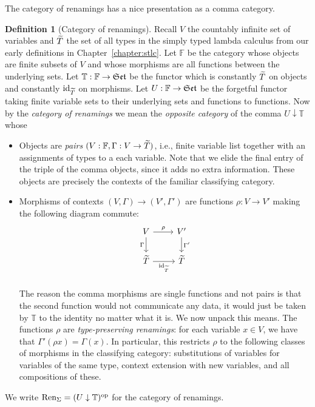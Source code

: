 \documentclass[12pt,twoside]{reedthesis}
\theoremstyle{definition}
\newtheorem{definition}{Definition}
\theoremstyle{remark}
\theoremstyle{plain}
\begin{document}
\newcommand{\fin}{\mathbb{F}}
The category of renamings has a nice presentation as a comma category.
\begin{definition}[Category of renamings]
  Recall \( V \) the countably infinite set of variables and \( \widetilde{T} \) the
  set of all types in the simply typed lambda calculus from our early
  definitions in Chapter~\ref{chapter:stlc}. Let \( \fin \) be the category
  whose objects are finite subsets of \( V \) and whose morphisms are all
  functions between the underlying sets. Let \( \mathbb{T} : \fin \rightarrow \catset \)
  be the functor which is constantly \( \widetilde{T} \) on objects and constantly
  \( \textrm{id}_{\widetilde{T}}\) on morphisms. Let \( U : \fin \rightarrow \catset \) be the forgetful
  functor taking finite variable sets to their underlying sets and functions to
  functions. Now by the \emph{category of renamings} we mean the \emph{opposite
    category} of the comma \( U \downarrow \mathbb{T} \) whose
  \begin{itemize}
    \item Objects are \emph{pairs} \( (V : \fin, \Gamma : V \rightarrow \types) \), i.e.,
    finite variable list together with an assignments of types to a each
    variable. Note that we elide the final entry of the triple of the
    comma objects, since it adds no extra information. These objects are
    precisely the contexts of the familiar classifying category.
    \item Morphisms of contexts \( (V , \Gamma) \rightarrow (V', \Gamma')\) are functions
    \( \rho : V \rightarrow V' \) making the following diagram commute:
    \[
      \begin{tikzcd}
        V \arrow{d}[swap]{\Gamma} \arrow{r}{\rho} & V' \arrow{d}{\Gamma'} \\
        \types \arrow{r}[swap]{\id_{\types}} & \types\\
      \end{tikzcd}
    \]
    The reason the comma morphisms are single functions and not pairs is
    that the second function would not communicate any data, it would just
    be taken by \( \mathbb{T}\) to the identity no matter what it is. We
    now unpack this means. The functions \( \rho \) are \emph{type-preserving
      renamings}: for each variable \( x \in V\), we have that
    \( \Gamma'(\rho x) = \Gamma(x)\). In particular, this restricts \( \rho \) to the
    following classes of morphisms in the classifying category:
    substitutions of variables for variables of the same type, context
    extension with new variables, and all compositions of these.
  \end{itemize}

  We write \( \text{Ren}_\Sigma = (U \downarrow \mathbb{T})^{\textrm{op}}\) for the category of
  renamings.
\end{definition}
\end{document}
